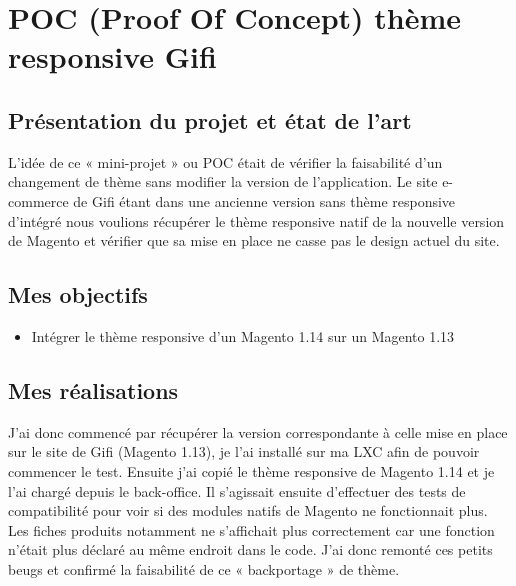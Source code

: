 \documentclass[a4paper,11pt,twoside]{report}
\begin{document}
\newpage
    
  \section{POC (Proof Of Concept) thème responsive Gifi}
    \subsection*{Présentation du projet et état de l'art}
    L'idée de ce « mini-projet » ou POC était de vérifier la faisabilité d'un changement de thème sans modifier la version de l'application. Le site e-commerce de Gifi étant dans une ancienne version sans thème responsive d'intégré nous voulions récupérer le thème responsive natif de la nouvelle version de Magento et vérifier que sa mise en place ne casse pas le design actuel du site. 
    \subsection*{Mes objectifs}
      \begin{itemize}

	\item Intégrer le thème responsive d'un Magento 1.14 sur un Magento 1.13 

      \end{itemize}
    \subsection*{Mes réalisations}
    J'ai donc commencé par récupérer la version correspondante à celle mise en place sur le site de Gifi (Magento 1.13), je l'ai installé sur ma LXC afin de pouvoir commencer le test. Ensuite j'ai copié le thème responsive de Magento 1.14 et je l'ai chargé depuis le back-office. Il s'agissait ensuite d'effectuer des tests de compatibilité pour voir si des modules natifs de Magento ne fonctionnait plus. Les fiches produits notamment ne s'affichait plus correctement car une fonction n'était plus déclaré au même endroit dans le code. J'ai donc remonté ces petits beugs et confirmé la faisabilité de ce « backportage » de thème. 
\end{document}
